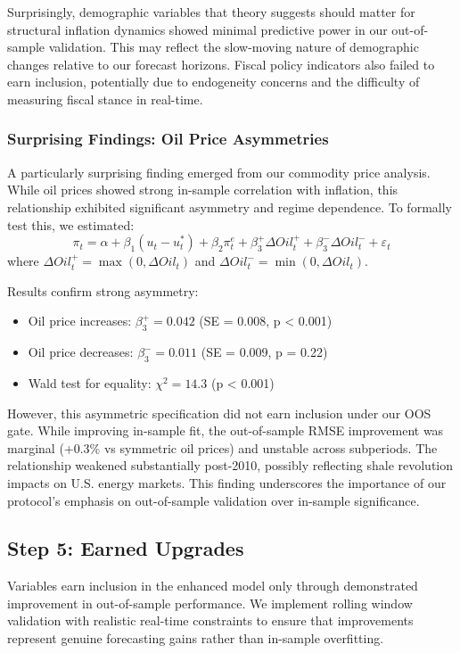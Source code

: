 \documentclass[12pt]{article}
\begin{document}
Surprisingly, demographic variables that theory suggests should matter for structural inflation dynamics showed minimal predictive power in our out-of-sample validation. This may reflect the slow-moving nature of demographic changes relative to our forecast horizons. Fiscal policy indicators also failed to earn inclusion, potentially due to endogeneity concerns and the difficulty of measuring fiscal stance in real-time.

\subsubsection{Surprising Findings: Oil Price Asymmetries}

A particularly surprising finding emerged from our commodity price analysis. While oil prices showed strong in-sample correlation with inflation, this relationship exhibited significant asymmetry and regime dependence. To formally test this, we estimated:
$$\pi_t = \alpha + \beta_1 (u_t - u_t^*) + \beta_2 \pi_t^e + \beta_3^+ \Delta Oil_t^+ + \beta_3^- \Delta Oil_t^- + \varepsilon_t$$
where $\Delta Oil_t^+ = \max(0, \Delta Oil_t)$ and $\Delta Oil_t^- = \min(0, \Delta Oil_t)$.

Results confirm strong asymmetry:
\begin{itemize}
\item Oil price increases: $\beta_3^+ = 0.042$ (SE = 0.008, p < 0.001)
\item Oil price decreases: $\beta_3^- = 0.011$ (SE = 0.009, p = 0.22)
\item Wald test for equality: $\chi^2 = 14.3$ (p < 0.001)
\end{itemize}

However, this asymmetric specification did not earn inclusion under our OOS gate. While improving in-sample fit, the out-of-sample RMSE improvement was marginal (+0.3\% vs symmetric oil prices) and unstable across subperiods. The relationship weakened substantially post-2010, possibly reflecting shale revolution impacts on U.S. energy markets. This finding underscores the importance of our protocol's emphasis on out-of-sample validation over in-sample significance.

\subsection{Step 5: Earned Upgrades}

Variables earn inclusion in the enhanced model only through demonstrated improvement in out-of-sample performance. We implement rolling window validation with realistic real-time constraints to ensure that improvements represent genuine forecasting gains rather than in-sample overfitting.
\end{document}
